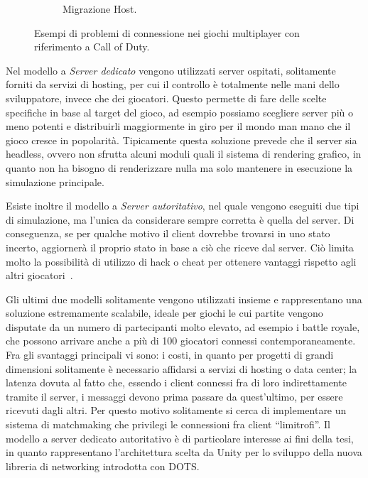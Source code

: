 \begin{figure}[!ht]
\begin{subfigure}{.49\textwidth}
      \caption{Migrazione Host.}
      \label{fig:host-migration}
    \end{subfigure}
    \caption{Esempi di problemi di connessione nei giochi multiplayer con riferimento a Call of Duty.}
    \label{fig:multiplayer-problems}
\end{figure}

Nel modello a \emph{Server dedicato} vengono utilizzati server ospitati, solitamente forniti da servizi di hosting, per cui il controllo è totalmente nelle mani dello sviluppatore, invece che dei giocatori. Questo permette di fare delle scelte specifiche in base al target del gioco, ad esempio possiamo scegliere server più o meno potenti e distribuirli maggiormente in giro per il mondo man mano che il gioco cresce in popolarità. Tipicamente questa soluzione prevede che il server sia headless, ovvero non sfrutta alcuni moduli quali il sistema di rendering grafico, in quanto non ha bisogno di renderizzare nulla ma solo mantenere in esecuzione la simulazione principale.

Esiste inoltre il modello a \emph{Server autoritativo}, nel quale vengono eseguiti due tipi di simulazione, ma l'unica da considerare sempre corretta è quella del server. Di conseguenza, se per qualche motivo il client dovrebbe trovarsi in uno stato incerto, aggiornerà il proprio stato in base a ciò che riceve dal server. Ciò limita molto la possibilità di utilizzo di hack o cheat per ottenere vantaggi rispetto agli altri giocatori~\cite{book:multiplayergameprogramming, youtube:realtime-multiplayer}.

Gli ultimi due modelli solitamente vengono utilizzati insieme e rappresentano una soluzione estremamente scalabile, ideale per giochi le cui partite vengono disputate da un numero di partecipanti molto elevato, ad esempio i battle royale, che possono arrivare anche a più di 100 giocatori connessi contemporaneamente. Fra gli svantaggi principali vi sono: i costi, in quanto per progetti di grandi dimensioni solitamente è necessario affidarsi a servizi di hosting o data center; la latenza dovuta al fatto che, essendo i client connessi fra di loro indirettamente tramite il server, i messaggi devono prima passare da quest'ultimo, per essere ricevuti dagli altri. Per questo motivo solitamente si cerca di implementare un sistema di matchmaking che privilegi le connessioni fra client ``limitrofi''.
Il modello a server dedicato autoritativo è di particolare interesse ai fini della tesi, in quanto rappresentano l'architettura scelta da Unity per lo sviluppo della nuova libreria di networking introdotta con DOTS.

